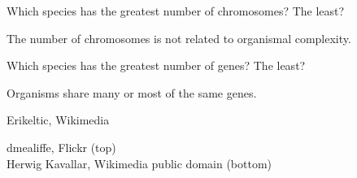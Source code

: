\documentclass[t]{beamer}
\begin{document}
{
\begin{frame}[b]{Which species has the greatest number of chromosomes? The least?}

\end{frame}
}
%
%
{
\begin{frame}[b]{The number of chromosomes is not related to organismal complexity.}

\end{frame}
}
%
%
{
\begin{frame}[b]{Which species has the greatest number of genes? The least?}

\end{frame}
}
%
%
{
\begin{frame}[b]{Organisms share many or most of the same genes.}

\end{frame}
}
%
%
{
\begin{frame}[b]

\tiny Erikeltic, Wikimedia 
\end{frame}
}
%
{
\begin{frame}[b]
	
\tiny  dmealiffe, Flickr  (top)\\Herwig Kavallar, Wikimedia public domain (bottom)
\end{frame}
}
%
\end{document}

